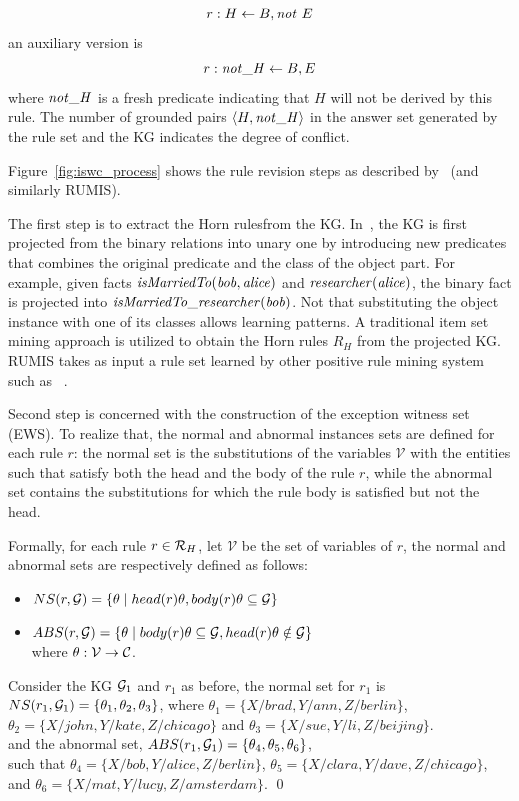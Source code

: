 \[r:H \leftarrow B, \mathit{not}~ E\] an auxiliary version is \[r:\mathit{not\_H} \leftarrow B, E\] where $\mathit{not\_H}$ is a fresh predicate indicating that $H$ will not be derived by this rule. The number of grounded pairs $\langle H,\mathit{not\_H}\rangle$ in the answer set generated by the rule set and the KG indicates the degree of conflict.


Figure~\ref{fig:iswc_process} shows the rule revision steps as described by~\cite{gad2016} (and similarly RUMIS). 


The first step is to extract the Horn rulesfrom the KG. In~\cite{gad2016}, the KG is first projected from the binary relations into unary one by introducing new predicates that combines the original predicate and the class of the object part. For example, given facts $\mathit{isMarriedTo(bob, alice)}$ and $\mathit{researcher(alice)}$, the binary fact is projected into $\mathit{isMarriedTo\_researcher(bob)}$. Not that substituting the object instance with one of its classes allows learning patterns. A traditional item set mining approach is utilized to obtain the Horn rules $R_H$ from the projected KG. RUMIS takes as input a rule set learned by other positive rule mining system such as ~\cite{amie,op,rdf2rules}.  


Second step is concerned with the construction of the exception witness set (EWS). To realize that, the normal and abnormal instances sets are defined for each rule $r$: the normal set is the substitutions of the variables $\mathcal{V}$ with the entities such that satisfy both the head and the body of the rule $r$, while the abnormal set contains the  substitutions for which the rule body is satisfied but not the head.

Formally, for each rule $r \in \mathcal{R}_H$, let $\mathcal{V}$ be the set of variables of $r$, the normal and abnormal sets are respectively defined as follows:
\begin{itemize}
\item $NS(r, \mathcal{G}) = \{\theta \mid head(r)\theta, body(r)\theta \subseteq \mathcal{G}\}$
\item $ABS(r, \mathcal{G}) = \{\theta \mid body(r)\theta \subseteq \mathcal{G} , head(r)\theta \notin \mathcal{G}\}$\\
where $\theta: \mathcal{V} \rightarrow \mathcal{C}$.
\end{itemize}

\begin{example}
Consider the KG $\mathcal{G}_1$ and $r_1$ as before, the normal set for $r_1$ is $NS(r_1,\mathcal{G}_1)=\{\theta_1, \theta_2 ,\theta_3\}$, where $\theta_1 = \{X/brad, Y/ann, Z/berlin\}$,\\  $\theta_2 = \{X/john, Y/kate, Z/chicago\}$ and $\theta_3 = \{X/sue, Y/li, Z/beijing\}$.\\ and the abnormal set, $ABS(r_1,\mathcal{G}_1)=\{\theta_4,\theta_5, \theta_6\}$, \\such that $\theta_4=\{X/bob, Y/alice, Z/berlin\}$,  $\theta_5=\{X/clara, Y/dave, Z/chicago\}$, and $\theta_6=\{X/mat, Y/lucy, Z/amsterdam\}$.
\qed
\end{example}

